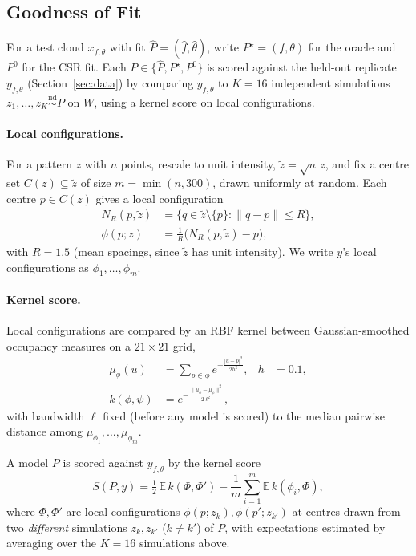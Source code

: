 \documentclass[twoside]{article}
\begin{document}
\subsection{Goodness of Fit}
\label{sec:score}

For a test cloud $x_{f, \theta}$ with fit $\hat P=(\hat f,\hat\theta)$, write $P^\star=(f,\theta)$ for the oracle and $P^0$ for the CSR fit. Each $P\in\{\hat P,P^\star,P^0\}$ is scored against the held-out replicate $y_{f, \theta}$ (Section~\ref{sec:data}) by comparing $y_{f, \theta}$ to $K=16$ independent simulations $z_1,\dots,z_K\stackrel{\text{iid}}\sim P$ on $W$, using a kernel score on local configurations.

\paragraph{Local configurations.}
For a pattern $z$ with $n$ points, rescale to unit intensity, $\tilde z=\sqrt n\,z$, and fix a centre set $C(z)\subseteq\tilde z$ of size $m=\min(n,300)$, drawn uniformly at random. Each centre $p\in C(z)$ gives a local configuration
\begin{align}
    N_R(p,\tilde z) &= \{q\in\tilde z\setminus\{p\}:\|q-p\|\le R\}, \\
    \phi(p;z) &= \frac1R\big(N_R(p,\tilde z)-p\big),
\end{align}
with $R=1.5$ (mean spacings, since $\tilde z$ has unit intensity). We write $y$'s local configurations as $\phi_1,\dots,\phi_m$.

\paragraph{Kernel score.}
Local configurations are compared by an RBF kernel between Gaussian-smoothed occupancy measures on a $21\times21$ grid,
\begin{align}
    \mu_\phi(u) &= \sum_{p\in\phi}e^{-\frac{|u-p|^2}{2h^2}}, & h&=0.1,\\
    k(\phi,\psi) &= e^{-\frac{\|\mu_\phi-\mu_\psi\|^2}{2\ell^2}},
\end{align}
with bandwidth $\ell$ fixed (before any model is scored) to the median pairwise distance among $\mu_{\phi_1},\dots,\mu_{\phi_m}$.

A model $P$ is scored against $y_{f, \theta}$ by the kernel score
\begin{equation}
  S(P,y)=\tfrac12\,\mathbb{E}\,k(\Phi,\Phi')-\frac1m\sum_{i=1}^{m}\mathbb{E}\,k(\phi_i,\Phi),
  \label{eq:kernel}
\end{equation}
where $\Phi,\Phi'$ are local configurations $\phi(p;z_k),\phi(p';z_{k'})$ at centres drawn from two \emph{different} simulations $z_k,z_{k'}$ ($k\ne k'$) of $P$, with expectations estimated by averaging over the $K=16$ simulations above.
\end{document}
